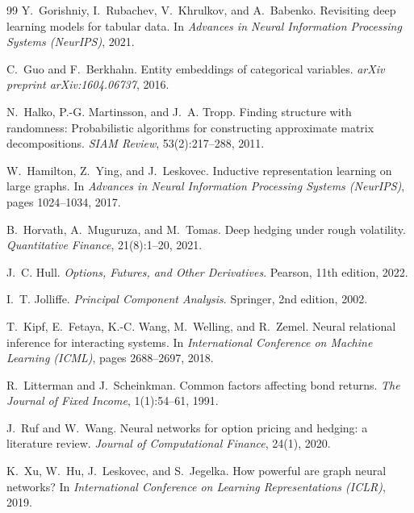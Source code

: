 \documentclass[11pt,a4paper]{article}
\begin{document}
\begin{thebibliography}{99}
Y.~Gorishniy, I.~Rubachev, V.~Khrulkov, and A.~Babenko.
\newblock Revisiting deep learning models for tabular data.
\newblock In \emph{Advances in Neural Information Processing Systems
  (NeurIPS)}, 2021.

C.~Guo and F.~Berkhahn.
\newblock Entity embeddings of categorical variables.
\newblock \emph{arXiv preprint arXiv:1604.06737}, 2016.

N.~Halko, P.-G. Martinsson, and J.~A. Tropp.
\newblock Finding structure with randomness: Probabilistic algorithms for
  constructing approximate matrix decompositions.
\newblock \emph{SIAM Review}, 53(2):217--288, 2011.

W.~Hamilton, Z.~Ying, and J.~Leskovec.
\newblock Inductive representation learning on large graphs.
\newblock In \emph{Advances in Neural Information Processing Systems
  (NeurIPS)}, pages 1024--1034, 2017.

B.~Horvath, A.~Muguruza, and M.~Tomas.
\newblock Deep hedging under rough volatility.
\newblock \emph{Quantitative Finance}, 21(8):1--20, 2021.

J.~C. Hull.
\newblock \emph{Options, Futures, and Other Derivatives}.
\newblock Pearson, 11th edition, 2022.

I.~T. Jolliffe.
\newblock \emph{Principal Component Analysis}.
\newblock Springer, 2nd edition, 2002.

T.~Kipf, E.~Fetaya, K.-C. Wang, M.~Welling, and R.~Zemel.
\newblock Neural relational inference for interacting systems.
\newblock In \emph{International Conference on Machine Learning (ICML)}, pages
  2688--2697, 2018.

R.~Litterman and J.~Scheinkman.
\newblock Common factors affecting bond returns.
\newblock \emph{The Journal of Fixed Income}, 1(1):54--61, 1991.

J.~Ruf and W.~Wang.
\newblock Neural networks for option pricing and hedging: a literature review.
\newblock \emph{Journal of Computational Finance}, 24(1), 2020.

K.~Xu, W.~Hu, J.~Leskovec, and S.~Jegelka.
\newblock How powerful are graph neural networks?
\newblock In \emph{International Conference on Learning Representations
  (ICLR)}, 2019.

\end{thebibliography}
\end{document}
